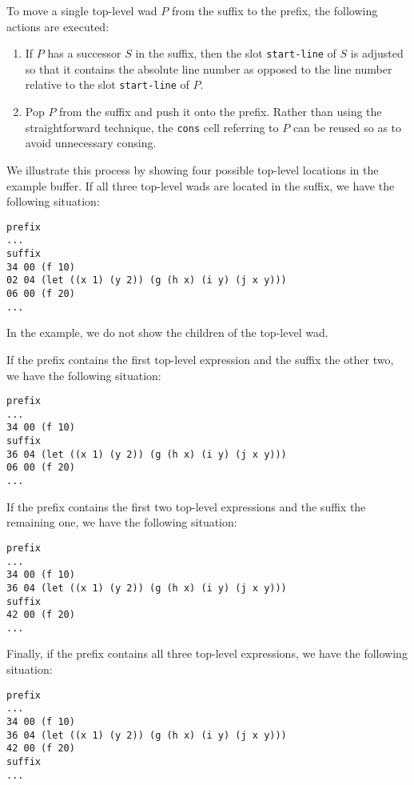 To move a single top-level wad $P$ from the suffix to the
prefix, the following actions are executed:

\begin{enumerate}
\item If $P$ has a successor $S$ in the suffix, then the slot
  \texttt{start-line} of $S$ is adjusted so that it contains the
  absolute line number as opposed to the line number relative to the
  slot \texttt{start-line} of $P$.
\item Pop $P$ from the suffix and push it onto the prefix.  Rather
  than using the straightforward technique, the \texttt{cons} cell
  referring to $P$ can be reused so as to avoid unnecessary consing.
\end{enumerate}

We illustrate this process by showing four possible top-level
locations in the example buffer.  If all three top-level wads
are located in the suffix, we have the following situation:

\begin{verbatim}
prefix
...
suffix
34 00 (f 10)
02 04 (let ((x 1) (y 2)) (g (h x) (i y) (j x y)))
06 00 (f 20)
...
\end{verbatim}

In the example, we do not show the children of the top-level wad.

If the prefix contains the first top-level expression and the suffix
the other two, we have the following situation:

\begin{verbatim}
prefix
...
34 00 (f 10)
suffix
36 04 (let ((x 1) (y 2)) (g (h x) (i y) (j x y)))
06 00 (f 20)
...
\end{verbatim}

If the prefix contains the first two top-level expressions and the suffix
the remaining one, we have the following situation:

\begin{verbatim}
prefix
...
34 00 (f 10)
36 04 (let ((x 1) (y 2)) (g (h x) (i y) (j x y)))
suffix
42 00 (f 20)
...
\end{verbatim}

Finally, if the prefix contains all three top-level expressions, we
have the following situation:


\begin{verbatim}
prefix
...
34 00 (f 10)
36 04 (let ((x 1) (y 2)) (g (h x) (i y) (j x y)))
42 00 (f 20)
suffix
...
\end{verbatim}

